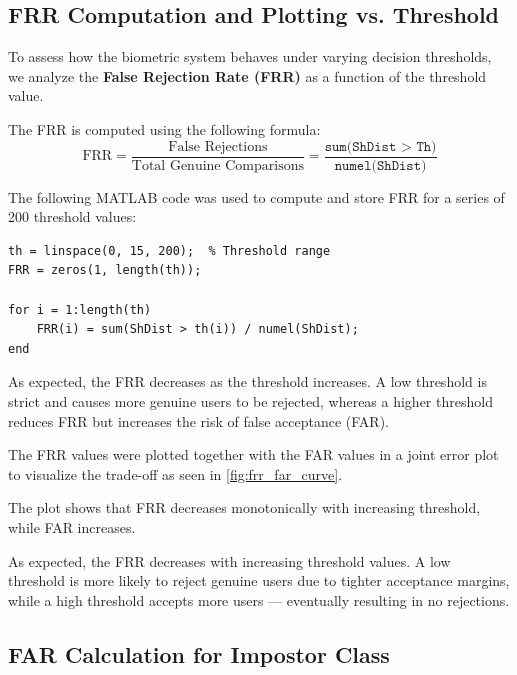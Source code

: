 \documentclass[a4paper,12pt]{article}
\begin{document}
\subsection{FRR Computation and Plotting vs. Threshold}

\noindent
To assess how the biometric system behaves under varying decision thresholds, we analyze the \textbf{False Rejection Rate (FRR)} as a function of the threshold value.

\vspace{0.5em}
\noindent
The FRR is computed using the following formula:
\[
\text{FRR} = \frac{\text{False Rejections}}{\text{Total Genuine Comparisons}} = \frac{\texttt{sum(ShDist > Th)}}{\texttt{numel(ShDist)}}
\]

\vspace{0.5em}
\noindent
The following MATLAB code was used to compute and store FRR for a series of 200 threshold values:

\begin{verbatim}
th = linspace(0, 15, 200);  % Threshold range
FRR = zeros(1, length(th));

for i = 1:length(th)
    FRR(i) = sum(ShDist > th(i)) / numel(ShDist);
end
\end{verbatim}

\vspace{0.5em}
\noindent
As expected, the FRR decreases as the threshold increases. A low threshold is strict and causes more genuine users to be rejected, whereas a higher threshold reduces FRR but increases the risk of false acceptance (FAR).

\vspace{1em}
\noindent
The FRR values were plotted together with the FAR values in a joint error plot to visualize the trade-off as seen in \autoref{fig:frr_far_curve}.

\vspace{0.5em}
\noindent
The plot shows that FRR decreases monotonically with increasing threshold, while FAR increases.

\vspace{0.5em}
\noindent
As expected, the FRR decreases with increasing threshold values. A low threshold is more likely to reject genuine users due to tighter acceptance margins, while a high threshold accepts more users — eventually resulting in no rejections.

\subsection{FAR Calculation for Impostor Class}
\end{document}
